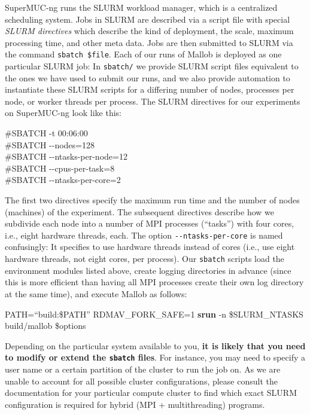 \documentclass[runningheads]{article}
\numberwithin{dummy}{subsection}
\begin{document}
SuperMUC-ng runs the SLURM workload manager, which is a centralized scheduling system.
Jobs in SLURM are described via a script file with special \textit{SLURM directives} which describe the kind of deployment, the scale, maximum processing time, and other meta data.
Jobs are then submitted to SLURM via the command \texttt{sbatch \$file}.
Each of our runs of Mallob is deployed as one particular SLURM job: In \texttt{sbatch/} we provide SLURM script files equivalent to the ones we have used to submit our runs, and we also provide automation to instantiate these SLURM scripts for a differing number of nodes, processes per node, or worker threads per process.
The SLURM directives for our experiments on SuperMUC-ng look like this:
\begin{ttfenv}
\#SBATCH -t 00:06:00\\
\#SBATCH -{}-nodes=128\\
\#SBATCH -{}-ntasks-per-node=12\\
\#SBATCH -{}-cpus-per-task=8\\
\#SBATCH -{}-ntasks-per-core=2
\end{ttfenv}
The first two directives specify the maximum run time and the number of nodes (machines) of the experiment.
The subsequent directives describe how we subdivide each node into a number of MPI processes (``tasks'') with four cores, i.e., eight hardware threads, each.
The option \texttt{-{}-ntasks-per-core} is named confusingly: It specifies to use hardware threads instead of cores (i.e., use eight hardware threads, not eight cores, per process).
Our \texttt{sbatch} scripts load the environment modules listed above, create logging directories in advance (since this is more efficient than having all MPI processes create their own log directory at the same time), and execute Mallob as follows:
\begin{ttfenv}
PATH=``build:\$PATH'' RDMAV\_FORK\_SAFE=1 \textbf{srun} -n \$SLURM\_NTASKS build/mallob \$options
\end{ttfenv}

Depending on the particular system available to you, \textbf{it is likely that you need to modify or extend the \texttt{sbatch} files}.
For instance, you may need to specify a user name or a certain partition of the cluster to run the job on.
As we are unable to account for all possible cluster configurations, please consult the documentation for your particular compute cluster to find which exact SLURM configuration is required for hybrid (MPI + multithreading) programs.
\end{document}

